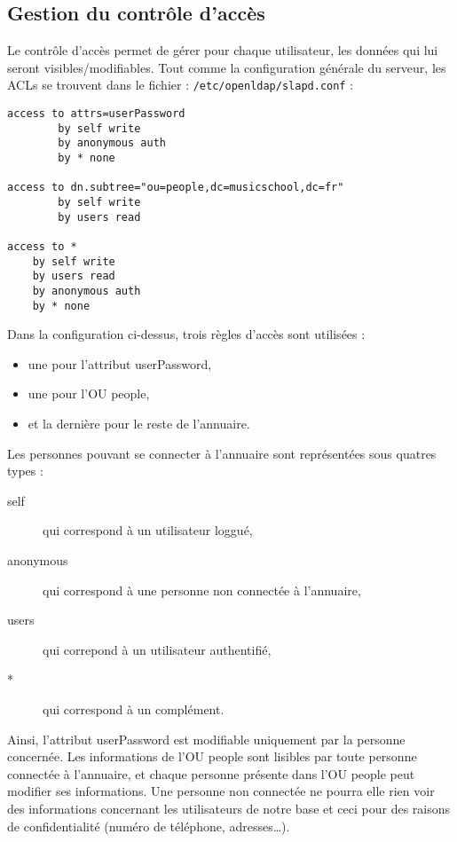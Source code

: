 \documentclass[12pt,a4paper,notitlepage]{article}
\begin{document}
\newpage
\subsection{Gestion du contrôle d'accès}

Le contrôle d'accès permet de gérer pour chaque utilisateur, les données qui lui seront visibles/modifiables. Tout comme la configuration générale du serveur, les ACLs se trouvent dans le fichier : \texttt{/etc/openldap/slapd.conf} :\\

\begin{lstlisting}[title=ACLs]
access to attrs=userPassword
		by self write
		by anonymous auth
		by * none

access to dn.subtree="ou=people,dc=musicschool,dc=fr"
		by self write
		by users read
				
access to *
	by self write
	by users read
	by anonymous auth
	by * none
\end{lstlisting}\bigskip


\noindent Dans la configuration ci-dessus, trois règles d'accès sont utilisées :
\begin{itemize}
\item une pour l'attribut userPassword,
\item une pour l'OU people,
\item et la dernière pour le reste de l'annuaire.
\end{itemize}
\bigskip
Les personnes pouvant se connecter à l'annuaire sont représentées sous quatres types : 
\begin{description}
\item[self] qui correspond à un utilisateur loggué,
\item[anonymous] qui correspond à une personne non connectée à l'annuaire,
\item[users] qui correpond à un utilisateur authentifié,
\item[*] qui correspond à un complément.
\end{description}

\bigskip

Ainsi, l'attribut userPassword est modifiable uniquement par la personne concernée. Les informations de l'OU people sont lisibles par toute personne connectée à l'annuaire, et chaque personne présente dans l'OU people peut modifier ses informations. Une personne non connectée ne pourra elle rien voir des informations concernant les utilisateurs de notre base et ceci pour des raisons de confidentialité (numéro de téléphone, adresses\dots).\\
\end{document}
